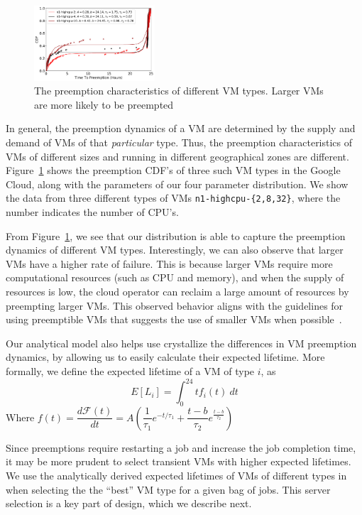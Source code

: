 \begin{figure}
  \centering 
  \includegraphics[width=0.4\textwidth]{../graphs/cdf_comparison_3.pdf}
  \caption{The preemption characteristics of different VM types. Larger VMs are more likely to be preempted}
  \label{fig:cdf-comparison}
\end{figure}

In general, the preemption dynamics of a VM are determined by the supply and demand of VMs of that \emph{particular} type.
Thus, the preemption characteristics of VMs of different sizes and running in different geographical zones are different.
Figure~\ref{fig:cdf-comparison} shows the preemption CDF's of three such VM types in the Google Cloud, along with the parameters of our four parameter distribution.
We show the data from three different types of VMs \texttt{n1-highcpu-\{2,8,32\}}, where the number indicates the number of CPU's. 

From Figure~\ref{fig:cdf-comparison}, we see that our distribution is able to capture the preemption dynamics of different VM types.
Interestingly, we can also observe that larger VMs have a higher rate of failure.
This is because larger VMs require more computational resources (such as CPU and memory), and when the supply of resources is low, the cloud operator can reclaim a large amount of resources by preempting larger VMs.
This observed behavior aligns with the guidelines for using preemptible VMs that suggests the use of smaller VMs when possible~\cite{gcp-preempt-faq}. 


Our analytical model also helps use crystallize the differences in VM preemption dynamics, by allowing us to easily calculate their expected lifetime. 
More formally, we define the expected lifetime of a VM of type $i$, as 
\begin{equation}
  \label{eq:expected-lifetime}
E[L_i] =  \int_{0}^{24} t {f_i}(t)~dt 
\end{equation}
Where $f(t) = \dfrac{d \mathscr{F}(t)} {dt} = A \left(\dfrac{1}{\tau_1}e^{-t/\tau_1} + \dfrac{t-b}{\tau_2}e^{\frac{t-b}{\tau_2}}\right) $ 

Since preemptions require restarting a job and increase the job completion time, it may be more prudent to select transient VMs with higher expected lifetimes. We use the analytically derived expected lifetimes of VMs of different types in \sysname when selecting the the ``best'' VM type for a given bag of jobs. This server selection is a key part of \sysname design, which we describe next. 

